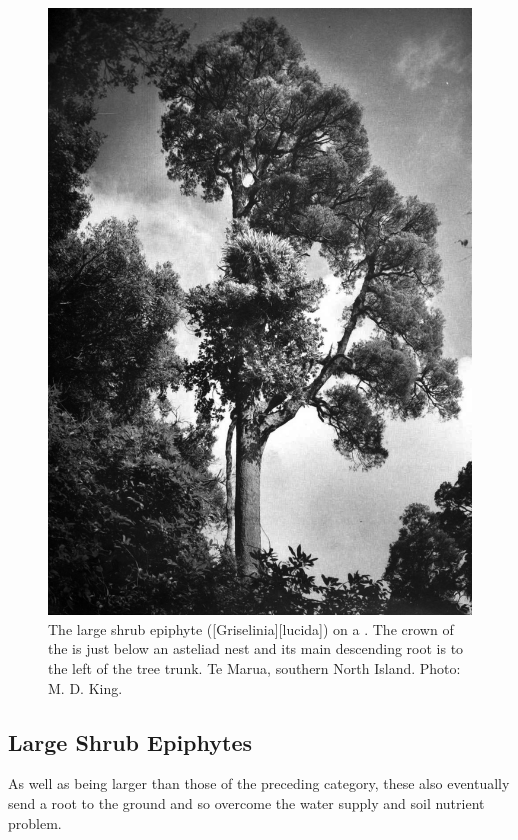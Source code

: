 \begin{figure}[!t]
\begin{minipage}[t]{\textwidth}
\begin{minipage}[t]{(\textwidth-\fgap) * \real{0.503}}
			\centering
			\includegraphics[width=\textwidth]{graphics/fig_045}
			\caption[The large shrub epiphyte puka]{The large shrub epiphyte  ([Griselinia][lucida]) on a .
			The crown of the  is just below an asteliad nest and its main descending root is to the left of the tree trunk.
			Te Marua, southern North Island.
			Photo: M. D. King.}%
			\label{fig:45puka}
		\end{minipage}
	\end{minipage}
\end{figure}

\subsection{Large Shrub Epiphytes}

As well as being larger than those of the preceding category, these also eventually send a root to the ground and so overcome the water supply and soil nutrient problem.

